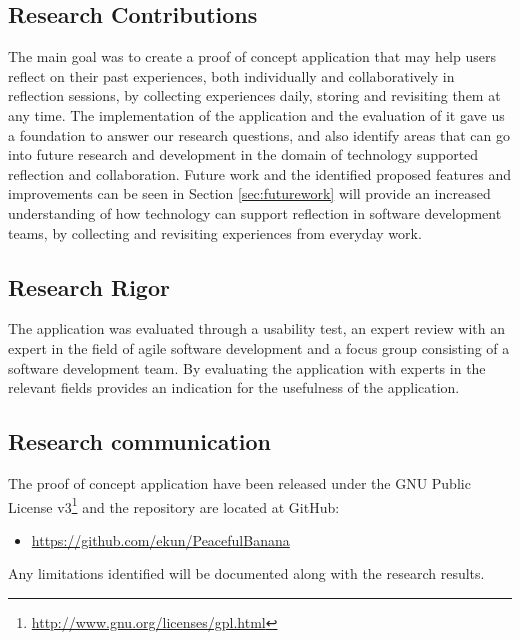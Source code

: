 \subsection{Research Contributions}
The main goal was to create a proof of concept application that may help users reflect on their past experiences, both individually and collaboratively in reflection sessions, by collecting experiences daily, storing and revisiting them at any time. The implementation of the application and the evaluation of it gave us a foundation to answer our research questions, and also identify areas that can go into future research and development in the domain of technology supported reflection and collaboration. 
Future work  and the identified proposed features and improvements can be seen in Section \ref{sec:futurework}
 will provide an increased understanding of how technology can support reflection in software development teams, by collecting and revisiting experiences from everyday work. 

\subsection{Research Rigor}
The application was evaluated through a usability test, an expert review with an expert in the field of agile software development and a focus group consisting of a software development team. By evaluating the application with experts in the relevant fields provides an indication for the usefulness of the application.

\subsection{Research communication}
The proof of concept application have been released under the GNU Public License v3\footnote{\url{http://www.gnu.org/licenses/gpl.html}} and the repository are located at GitHub: 
\begin{itemize}
	\item \url{https://github.com/ekun/PeacefulBanana}
\end{itemize} 
Any limitations identified  will be documented along with the research results. 



